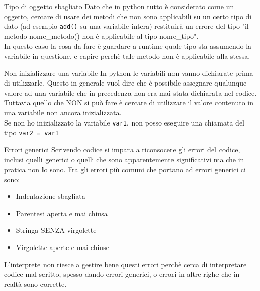 \documentclass[10pt]{article}
\newcommand{\<}{\langle}
\renewcommand{\>}{\rangle}
\theoremstyle{mystyle}{\newtheorem*{remark}{Nota}}
\theoremstyle{mystyle}{\newtheorem*{remarks}{Note}}
\theoremstyle{mystyle}{\newtheorem*{example}{Esempio}}
\theoremstyle{mystyle}{\newtheorem*{examples}{Esempi}}
\theoremstyle{definition}{\newtheorem*{exercise}{Exercise}}
\theoremstyle{warn}
\begin{document}
\begin{flagbox}[orange]{Tipo di oggetto sbagliato}
Dato che in python tutto è considerato come un oggetto, cercare di usare dei metodi che non sono applicabili su un certo tipo di dato (ad esempio \texttt{add()} su una variabile intera) restituirà un errore del tipo "il metodo nome\_metodo() non è applicabile al tipo nome\_tipo".\\
In questo caso la cosa da fare è guardare a runtime quale tipo sta assumendo la variabile in questione, e capire perchè tale metodo non è applicabile alla stessa.
\end{flagbox}

\begin{flagbox}[orange]{Non inizializzare una variabile}
In python le variabili non vanno dichiarate prima di utilizzarle. Questo in generale vuol dire che è possibile assegnare qualunque valore ad una variabile che in precedenza non era mai stata dichiarata nel codice.\\
Tuttavia quello che NON si può fare è cercare di utilizzare il valore contenuto in una variabile non ancora inizializzata.\\
Se non ho inizializzato la variabile \texttt{var1}, non posso eseguire una chiamata del tipo \texttt{var2 = var1}
\end{flagbox}

\begin{flagbox}[orange]{Errori generici}
Scrivendo codice si impara a riconsocere gli errori del codice, inclusi quelli generici o quelli che sono apparentemente significativi ma che in pratica non lo sono. Fra gli errori più comuni che portano ad errori generici ci sono:
\begin{itemize}
    \item Indentazione sbagliata
    \item Parentesi aperta e mai chiusa
    \item Stringa SENZA virgolette
    \item Virgolette aperte e mai chiuse
\end{itemize}
L'interprete non riesce a gestire bene questi errori perchè cerca di interpretare codice mal scritto, spesso dando errori generici, o errori in altre righe che in realtà sono corrette.
\end{flagbox}
\end{document}
